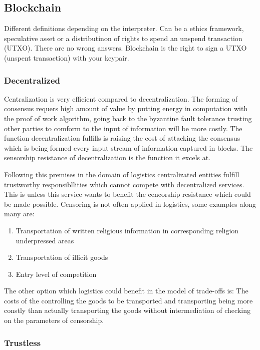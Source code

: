 
\subsection{Blockchain}

Different definitions depending on the interpreter. Can be a ethics framework, speculative asset or a distributinon of rights to spend an unspend transaction (UTXO). There are no wrong answers.
Blockchain is the right to sign a UTXO (unspent transaction) with your keypair.

\subsubsection{Decentralized}

Centralization is very efficient compared to decentralization. The forming of consensus requers high amount of value by putting energy in computation with the proof of work algorithm, going back to the byzantine fault tolerance trusting other parties to comform to the input of information will be more costly. The function decentralization fulfills is raising the cost of attacking the consensus which is being formed every input stream of information captured in blocks. The sensorship resistance of decentralization is the function it excels at.\par
Following this premises in the domain of logistics centralizated entities fulfill trustworthy responsibllities which cannot compete with decentralized services. This is unless this service wants to benefit the cencorship resistance which could be made possible. Censoring is not often applied in logistics, some examples along many are:
\begin{enumerate}
  \item Transportation of written religious information in corresponding religion underpressed areas
  \item Transportation of illicit goods
  \item Entry level of competition
\end{enumerate}
The other option which logistics could benefit in the model of trade-offs is:
The costs of the controlling the goods to be transported and transporting being more constly than actually transporting the goods without intermediation of checking on the parameters of censorship.

\subsubsection{Trustless}


